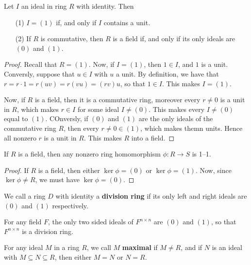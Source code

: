 \begin{lemma}\label{1.4.1}
    Let $I$ an ideal in ring $R$ with identity. Then
    \begin{enumerate}
        \item[(1)] $I=(1)$ if, and only if $I$ contains a unit.

        \item[(2)] If $R$ is commutative, then $R$ is a field if, and only if
            its only ideals are $(0)$ and $(1)$.
    \end{enumerate}
\end{lemma}
\begin{proof}
    Recall that $R=(1)$. Now, if $I=(1)$, then $1 \in I$, and  $1$ is a unit.
    Conversly, suppose that $u \in I$ with $u$ a unit. By definition, we have
    that  $r=r \cdot 1=r(uv)=r(vu)=(rv)u$, so that $1 \in I$. This makes
    $I=(1)$.

    Now, if $R$ is a field, then it is a commutative ring, moreover every  $r
    \neq 0$ is a unit in $R$, which makes $r \in I$ for some ideal $I \neq (0)$.
    This makes every $I \neq (0)$ equal to $(1)$. COnversly, if $(0)$ and $(1)$
    are the only ideals of the commutative ring $R$, then every $r \neq 0 \in
    (1)$, which makes themn units. Hence all nonzero $r$ is a unit in $R$. This
    makes $R$ into a field.
\end{proof}
\begin{corollary}
    If $R$ is a field, then any nonzero ring homomorphism $\phi:R \xrightarrow{}
    S$ is 1--1.
\end{corollary}
\begin{proof}
    If $R$ is a field, then either $\ker{\phi}=(0)$ or $\ker{\phi}=(1)$. Now,
    since $\ker{\phi} \neq R$, we must have $\ker{\phi}=(0)$.
\end{proof}

\begin{definition}
    We call a ring $D$ with identity a  \textbf{division ring} if its only left
    and right ideals are $(0)$ and $(1)$ respectively.
\end{definition}

\begin{example}\label{1.14}
    For any field $F$, the only two sided ideals of  $F^{n \times n}$ are $(0)$
    and $(1)$, so that $F^{n \times n}$ is a division ring.
\end{example}

\begin{definition}
    For any ideal $M$ in a ring $R$, we call $M$  \textbf{maximal}
    if $M \neq R$, and if  $N$ is an ideal with  $M \subseteq N \subseteq R$,
    then either  $M=N$ or  $N=R$.
\end{definition}

